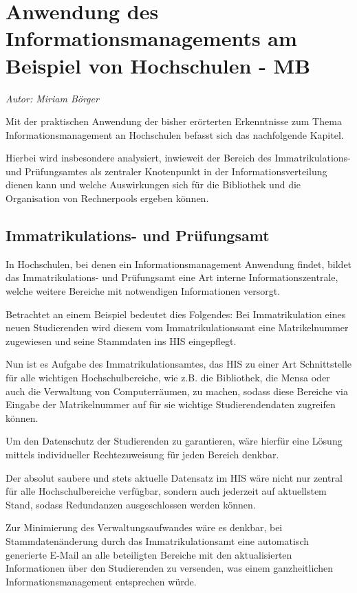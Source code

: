 \section{Anwendung des Informationsmanagements am Beispiel von Hochschulen - MB}
\textit{Autor: Miriam Börger}

Mit der praktischen Anwendung der bisher erörterten Erkenntnisse zum Thema Informationsmanagement an Hochschulen befasst sich das nachfolgende Kapitel. 

Hierbei wird insbesondere analysiert, inwieweit der Bereich des Immatrikulations- und Prüfungsamtes als zentraler Knotenpunkt in der Informationsverteilung dienen kann und welche Auswirkungen sich für die Bibliothek und die Organisation von Rechnerpools ergeben können.

\subsection{Immatrikulations- und Prüfungsamt}
\label{immatrikulations_und_pruefungsamt}
In Hochschulen, bei denen ein Informationsmanagement Anwendung findet, bildet das Immatrikulations- und Prüfungsamt eine Art interne Informationszentrale, welche weitere Bereiche mit notwendigen Informationen versorgt. 

Betrachtet an einem Beispiel bedeutet dies Folgendes: Bei Immatrikulation eines neuen Studierenden wird diesem vom Immatrikulationsamt eine Matrikelnummer zugewiesen und seine Stammdaten ins HIS eingepflegt. 

Nun ist es Aufgabe des Immatrikulationsamtes, das HIS zu einer Art Schnittstelle für alle wichtigen Hochschulbereiche, wie z.B. die Bibliothek, die Mensa oder auch die Verwaltung von Computerräumen, zu machen, sodass diese Bereiche via Eingabe der Matrikelnummer auf für sie wichtige Studierendendaten zugreifen können.

Um den Datenschutz der Studierenden zu garantieren, wäre hierfür eine Lösung mittels individueller Rechtezuweisung für jeden Bereich denkbar.

Der absolut saubere und stets aktuelle Datensatz im HIS wäre nicht nur zentral für alle Hochschulbereiche verfügbar, sondern auch jederzeit auf aktuellstem Stand, sodass Redundanzen ausgeschlossen werden können.

Zur Minimierung des Verwaltungsaufwandes wäre es denkbar, bei Stammdatenänderung durch das Immatrikulationsamt eine automatisch generierte E-Mail an alle beteiligten Bereiche mit den aktualisierten Informationen über den Studierenden zu versenden, was einem ganzheitlichen Informationsmanagement entsprechen würde.

